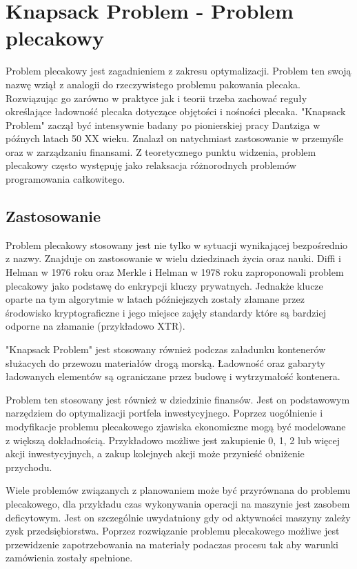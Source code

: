 \section{Knapsack Problem - Problem plecakowy}
Problem plecakowy jest zagadnieniem z zakresu optymalizacji. Problem ten swoją nazwę wziął z analogii do rzeczywistego problemu pakowania plecaka. Rozwiązując go zarówno w praktyce jak i teorii trzeba zachować reguły określające ładowność plecaka dotyczące objętości i nośności plecaka. "Knapsack Problem" zaczął być intensywnie badany po pionierskiej pracy Dantziga\cite{DantzigArticle} w późnych latach 50 XX wieku. Znalazł on natychmiast zastosowanie w przemyśle oraz w zarządzaniu finansami. Z teoretycznego punktu widzenia, problem plecakowy często występuję jako relaksacja różnorodnych problemów programowania całkowitego\cite{PisingerThesis}.
\subsection{Zastosowanie}
Problem plecakowy stosowany jest nie tylko w sytuacji wynikającej bezpośrednio z nazwy. Znajduje on zastosowanie w wielu dziedzinach życia oraz nauki. Diffi i Helman\cite{DiffieHelmanArticle} w 1976 roku oraz Merkle i Helman\cite{MerkleHelmanArticle} w 1978 roku zaproponowali problem plecakowy jako podstawę do enkrypcji kluczy prywatnych. Jednakże klucze oparte na tym algorytmie w latach późniejszych zostały złamane przez środowisko kryptograficzne i jego miejsce zajęły standardy które są bardziej odporne na złamanie (przykładowo XTR).

"Knapsack Problem" jest stosowany również podczas załadunku kontenerów służacych do przewozu materiałów drogą morską. Ładowność oraz gabaryty ładowanych elementów są ograniczane przez budowę i wytrzymałość kontenera.

Problem ten stosowany jest również w dziedzinie finansów. Jest on podstawowym narzędziem do optymalizacji portfela inwestycyjnego. Poprzez uogólnienie i modyfikacje problemu plecakowego zjawiska ekonomiczne mogą być modelowane z większą dokładnością. Przykładowo możliwe jest zakupienie 0, 1, 2 lub więcej akcji inwestycyjnych, a zakup kolejnych akcji może przynieść obniżenie przychodu.

Wiele problemów związanych z planowaniem może być przyrównana do problemu plecakowego, dla przykładu czas wykonywania operacji na maszynie jest zasobem deficytowym. Jest on szczególnie uwydatniony gdy od aktywności maszyny zależy zysk przedsiębiorstwa. Poprzez rozwiązanie problemu plecakowego możliwe jest przewidzenie zapotrzebowania na materiały podaczas procesu tak aby warunki zamówienia zostały spełnione\cite{BartholdiChapter}.

